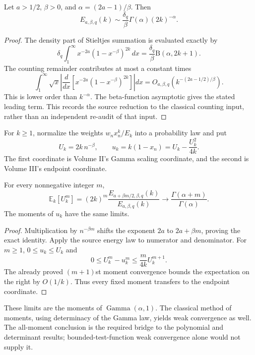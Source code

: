 \begin{proposition}
Let $a>1/2$, $\beta>0$, and $\alpha=(2a-1)/\beta$. Then
\[
E_{a,\beta,q}(k)\sim
\frac{\delta_q}{\beta}\Gamma(\alpha)(2k)^{-\alpha}.
\]
\end{proposition}
\begin{proof}
The density part of Stieltjes summation is evaluated exactly by
\[
\delta_q\int_1^\infty x^{-2a}(1-x^{-\beta})^{2k}\,dx
=\frac{\delta_q}{\beta}\mathrm B(\alpha,2k+1).
\]
The counting remainder contributes at most a constant times
\[
\int_1^\infty\sqrt x
\left|\frac{d}{dx}\left[x^{-2a}(1-x^{-\beta})^{2k}\right]\right|dx
=O_{a,\beta,q}\left(k^{-(2a-1/2)/\beta}\right).
\]
This is lower order than $k^{-\alpha}$. The beta-function asymptotic gives the stated leading term. This records the source reduction to the classical counting input, rather than an independent re-audit of that input.
\end{proof}

For $k\ge1$, normalize the weights $w_nx_n^k/E_k$ into a probability law and put
\[
U_k=2k\,n^{-\beta},
\qquad
u_k=k(1-x_n)=U_k-\frac{U_k^2}{4k}.
\]
The first coordinate is Volume II's Gamma scaling coordinate, and the second is Volume III's endpoint coordinate.

\begin{proposition}
For every nonnegative integer $m$,
\[
\mathbb E_k[U_k^m]
=(2k)^m\frac{E_{a+\beta m/2,\beta,q}(k)}{E_{a,\beta,q}(k)}
\longrightarrow\frac{\Gamma(\alpha+m)}{\Gamma(\alpha)}.
\]
The moments of $u_k$ have the same limits.
\end{proposition}
\begin{proof}
Multiplication by $n^{-\beta m}$ shifts the exponent $2a$ to $2a+\beta m$, proving the exact identity. Apply the source energy law to numerator and denominator. For $m\ge1$, $0\le u_k\le U_k$ and
\[
0\le U_k^m-u_k^m\le
\frac{m}{4k}U_k^{m+1}.
\]
The already proved $(m+1)$st moment convergence bounds the expectation on the right by $O(1/k)$. Thus every fixed moment transfers to the endpoint coordinate.
\end{proof}

These limits are the moments of $\operatorname{Gamma}(\alpha,1)$. The classical method of moments, using determinacy of the Gamma law, yields weak convergence as well. The all-moment conclusion is the required bridge to the polynomial and determinant results; bounded-test-function weak convergence alone would not supply it.

